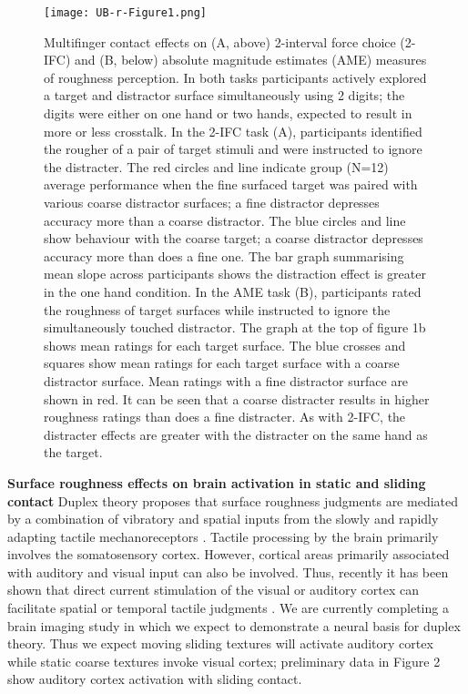 \begin{figure}
	\centering
	\texttt{[image: UB-r-Figure1.png]}
	\caption{Multifinger contact effects on (A, above) 2-interval force choice (2-IFC) and (B, below) absolute magnitude estimates (AME) measures of roughness perception. In both tasks participants actively explored a target and distractor surface simultaneously using 2 digits; the digits were either on one hand or two hands, expected to result in more or less crosstalk. In the 2-IFC task (A), participants identified the rougher of a pair of target stimuli and were instructed to ignore the distracter. The red circles and line indicate group (N=12) average performance when the fine surfaced target was paired with various coarse distractor surfaces; a fine distractor depresses accuracy more than a coarse distractor. The blue circles and line show behaviour with the coarse target; a coarse distractor depresses accuracy more than does a fine one. The bar graph summarising mean slope across participants shows the distraction effect is greater in the one hand condition. 
		In the AME task (B), participants rated the roughness of target surfaces while instructed to ignore the simultaneously touched distractor. The graph at the top of figure 1b shows mean ratings for each target surface. The blue crosses and squares show mean ratings for each target surface with a coarse distractor surface. Mean ratings with a fine distractor surface are shown in red. It can be seen that a coarse distracter results in higher roughness ratings than does a fine distracter. As with 2-IFC, the distracter effects are greater with the distracter on the same hand as the target.}
	\label{fig:Multifingercontacts}
\end{figure}

\textbf{Surface roughness effects on brain activation in static and sliding contact}
Duplex theory proposes that surface roughness judgments are mediated by a combination of vibratory and spatial inputs from the slowly and rapidly adapting tactile mechanoreceptors \cite{Hollins2000}. Tactile processing by the brain primarily involves the somatosensory cortex. However, cortical areas primarily associated with auditory and visual input can also be involved. Thus, recently it has been shown that direct current stimulation of the visual or auditory cortex can facilitate spatial or temporal tactile judgments \cite{yau2014}. We are currently completing a brain imaging study in which we expect to demonstrate a neural basis for duplex theory. Thus we expect moving sliding textures will activate auditory cortex while static coarse textures invoke visual cortex; preliminary data in Figure 2 show auditory cortex activation with sliding contact.

